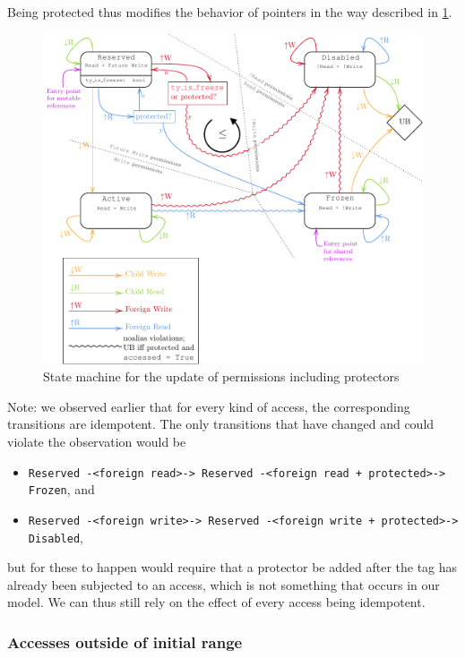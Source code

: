 \documentclass[a4paper,11pt]{article}
\theoremstyle{plain}
\theoremstyle{definition}
\theoremstyle{remark}
\newcommand{\tperm}[1]{\texttt{#1}}
\begin{document}
Being protected thus modifies the behavior of pointers in the way described in \ref{fig:state-machine}.

\begin{figure}
    \includegraphics[width=\textwidth]{../figs/state-machine.pdf}
    \caption{State machine for the update of permissions including protectors}
    \label{fig:state-machine}
\end{figure}

Note: we observed earlier that for every kind of access, the corresponding transitions
are idempotent. The only transitions that have changed and could violate the observation would be

\begin{itemize}
    \item \tperm{Reserved -<foreign read>-> Reserved -<foreign read + protected>-> Frozen}, and
    \item \tperm{Reserved -<foreign write>-> Reserved -<foreign write + protected>-> Disabled},
\end{itemize}

but for these to happen would require that a protector be added after the tag has already been
subjected to an access, which is not something that occurs in our model.
We can thus still rely on the effect of every access being idempotent.

\subsubsection{Accesses outside of initial range}
\end{document}
